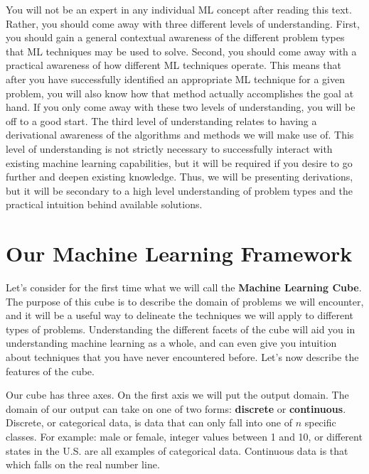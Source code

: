You will not be an expert in any individual ML concept after reading this text. Rather, you should come away with three different levels of understanding. First, you should gain a general contextual awareness of the different problem types that ML techniques may be used to solve. Second, you should come away with a practical awareness of how different ML techniques operate. This means that after you have successfully identified an appropriate ML technique for a given problem, you will also know how that method actually accomplishes the goal at hand. If you only come away with these two levels of understanding, you will be off to a good start. The third level of understanding relates to having a derivational awareness of the algorithms and methods we will make use of. This level of understanding is not strictly necessary to successfully interact with existing machine learning capabilities, but it will be required if you desire to go further and deepen existing knowledge. Thus, we will be presenting derivations, but it will be secondary to a high level understanding of problem types and the practical intuition behind available solutions.

\section{Our Machine Learning Framework}

Let's consider for the first time what we will call the \textbf{Machine Learning Cube}. The purpose of this cube is to describe the domain of problems we will encounter, and it will be a useful way to delineate the techniques we will apply to different types of problems. Understanding the different facets of the cube will aid you in understanding machine learning as a whole, and can even give you intuition about techniques that you have never encountered before. Let's now describe the features of the cube.

Our cube has three axes. On the first axis we will put the output domain. The domain of our output can take on one of two forms: \textbf{discrete} or \textbf{continuous}. Discrete, or categorical data, is data that can only fall into one of $n$ specific classes. For example: male or female, integer values between 1 and 10, or different states in the U.S. are all examples of categorical data. Continuous data is that which falls on the real number line.

